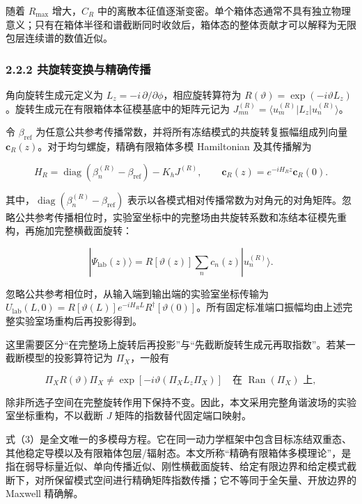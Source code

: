 \documentclass[
  UTF8,
  zihao=-4,
  fontset=fandol]{ctexart}
\begin{document}
随着 \(R_{\max}\) 增大，\(C_R\)
中的离散本征值逐渐变密。单个箱体态通常不具有独立物理意义；只有在箱体半径和谱截断同时收敛后，箱体态的整体贡献才可以解释为无限包层连续谱的数值近似。

\hypertarget{ux5171ux65cbux8f6cux53d8ux6362ux4e0eux7cbeux786eux4f20ux64ad}{%
\subsubsection{2.2.2
共旋转变换与精确传播}\label{ux5171ux65cbux8f6cux53d8ux6362ux4e0eux7cbeux786eux4f20ux64ad}}

角向旋转生成元定义为 \(L_z=-i\,\partial/\partial\phi\)，相应旋转算符为
\(R(\vartheta)=\exp(-i\vartheta L_z)\)。旋转生成元在有限箱体本征模基底中的矩阵元记为
\(J_{mn}^{(R)}=\langle u_m^{(R)}|L_z|u_n^{(R)}\rangle\)。

令 \(\beta_{\mathrm{ref}}\)
为任意公共参考传播常数，并将所有冻结模式的共旋转复振幅组成列向量
\(\mathbf c_R(z)\)。对于均匀螺旋，精确有限箱体多模 Hamiltonian
及其传播解为

\[
H_R=\operatorname{diag}\!\left(\beta_n^{(R)}-\beta_{\mathrm{ref}}\right)-K_hJ^{(R)},\qquad
\mathbf c_R(z)=e^{-iH_Rz}\mathbf c_R(0).
\tag{3}
\]

其中，\(\operatorname{diag}(\beta_n^{(R)}-\beta_{\mathrm{ref}})\)
表示以各模式相对传播常数为对角元的对角矩阵。忽略公共参考传播相位时，实验室坐标中的完整场由共旋转系数和冻结本征模先重构，再施加完整横截面旋转：

\[
|\Psi_{\mathrm{lab}}(z)\rangle
=R[\vartheta(z)]
\sum_n c_n(z)|u_n^{(R)}\rangle .
\]

忽略公共参考相位时，从输入端到输出端的实验室坐标传输为
\(U_{\mathrm{lab}}(L,0)=R[\vartheta(L)]e^{-iH_RL}R^\dagger[\vartheta(0)]\)。所有固定标准端口振幅均由上述完整实验室场重构后再投影得到。

这里需要区分``在完整场上旋转后再投影''与``先截断旋转生成元再取指数''。若某一截断模型的投影算符记为
\(\Pi_X\)，一般有

\[
\Pi_XR(\vartheta)\Pi_X
\neq
\exp[-i\vartheta(\Pi_XL_z\Pi_X)]
\quad\text{在 }\operatorname{Ran}(\Pi_X)\text{ 上},
\]

除非所选子空间在完整旋转作用下保持不变。因此，本文采用完整角谐波场的实验室坐标重构，不以截断
\(J\) 矩阵的指数替代固定端口映射。

式（3）是全文唯一的多模母方程。它在同一动力学框架中包含目标冻结双重态、其他稳定导模以及有限箱体包层/辐射态。本文所称``精确有限箱体多模理论''，是指在弱导标量近似、单向传播近似、刚性横截面旋转、给定有限边界和给定模式截断下，对所保留模式空间进行精确矩阵指数传播；它不等同于全矢量、开放边界的
Maxwell 精确解。
\end{document}
